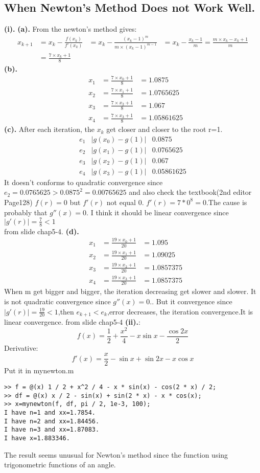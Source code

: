 \subsection{ When Newton’s Method Does not Work Well.}
\textbf{(i).} 
\textbf{(a).}
From the newton's method gives:
\[\begin{aligned}
    x_{k+1}&=x_k-\frac{f(x_k)}{f'(x_k)}&=x_k-\frac{(x_k-1)^m}{m\times (x_k-1)^{m-1}}&=x_k-\frac{x_k-1}{m}=\frac{m\times x_k-x_k+1}{m}\\
    &=\frac{7\times x_k+1}{8}
\end{aligned}\]
\textbf{(b).}
\[\begin{aligned}
    &x_1&=\frac{7\times x_0+1}{8}&=1.0875\\
    &x_2&=\frac{7\times x_1+1}{8}&=1.0765625\\
    &x_3&=\frac{7\times x_2+1}{8}&=1.067\\
    &x_4&=\frac{7\times x_3+1}{8}&=1.05861625
\end{aligned}\]
\textbf{(c).}
After each iteration, the $x_k$ get closer and closer to the root r=1.
\[\begin{array}{c|c|c}
    e_1 &|g(x_0)-g(1)|& 0.0875\\
    e_2 &|g(x_1)-g(1)|& 0.0765625\\
    e_3 &|g(x_2)-g(1)|& 0.067\\
    e_4 &|g(x_3)-g(1)|& 0.05861625
\end{array}\]
It doesn't conforms to quadratic convergence since $e_2=0.0765625>0.0875^2=0.00765625$ and also check the textbook(2nd editor Page128) $f(r)=0$ but $f'(r)$ not equal 0. $f'(r)=7*0^8=0$.The cause is probably
that $g''(x)=0$. I think it should be linear convergence since $|g'(r)|=\frac{7}{8}<1$\\ from slide chap5-4.
\textbf{(d).}
\[\begin{aligned}
    &x_1&=\frac{19\times x_0+1}{20}&=1.095\\
    &x_2&=\frac{19\times x_1+1}{20}&=1.09025\\
    &x_3&=\frac{19\times x_2+1}{20}&=1.0857375\\
    &x_4&=\frac{19\times x_3+1}{20}&=1.0857375
\end{aligned}\]
When m get bigger and bigger, the iteration decreasing get slower and slower. It is not quadratic convergence since $g''(x)=0$.. But it convergence since $|g'(r)|=\frac{19}{20}<1$,then $e_{k+1}<e_k$,error decreases, the iteration convergence.It is linear convergence. from slide chap5-4
\newpage
\textbf{(ii).}:\\
\[f(x)=\frac12+\frac{x^2}4-x\sin{x}-\frac{\cos{2x}}2\]
Derivative:
\[f'(x) = \frac x2 - \sin x + \sin{2 x} - x\cos x\]
Put it in mynewton.m
\begin{verbatim}
>> f = @(x) 1 / 2 + x^2 / 4 - x * sin(x) - cos(2 * x) / 2;
>> df = @(x) x / 2 - sin(x) + sin(2 * x) - x * cos(x);
>> x=mynewton(f, df, pi / 2, 1e-3, 100);
I have n=1 and xx=1.7854.
I have n=2 and xx=1.84456.
I have n=3 and xx=1.87083.
I have x=1.883346.
\end{verbatim}
The result seems unusual for Newton's method since the function using trigonometric functions of an angle. 
\newpage
